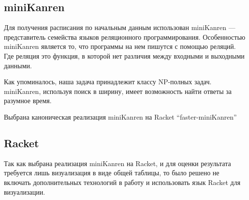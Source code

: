 \subsection{miniKanren} 
Для получения расписания по начальным данным использован miniKanren --- представитель семейства языков реляционного программирования. Особенностью miniKanren является то, что программы на нем пишутся с помощью реляций. Где реляция это функция, в которой нет различия между входными и выходными данными.


Как упоминалось, наша задача принадлежит классу NP-полных задач.
miniKanren, используя поиск в ширину, имеет возможность найти ответы за разумное время.


Выбрана каноническая реализация miniKanren на Racket ``faster-miniKanren''~\cite{faster}


\subsection{Racket}
Так как выбрана реализация miniKanren на Racket, и для оценки результата требуется лишь визуализация в виде общей таблицы, то было решено не включать дополнительных технологий в работу и использовать язык Racket для визуализации.
